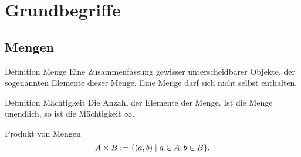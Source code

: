 \documentclass[main.tex]{subfiles}
\begin{document}
\section*{Grundbegriffe}
\subsection*{Mengen}
\begin{karte}{Definition Menge}
    Eine Zusammenfassung gewisser unterscheidbarer Objekte, 
    der sogenannten Elemente dieser Menge. Eine Menge darf sich nicht selbst enthalten.
\end{karte}
\begin{karte}{Definition Mächtigkeit}
    Die Anzahl der Elemente der Menge. Ist die Menge unendlich, 
    so ist die Mächtigkeit \( \infty \).
\end{karte}
\begin{karte}{Produkt von Mengen}
    \[ A \times B := \{ (a,b) \;\vert \; 
    a \in A, b \in B \}. \]
\end{karte}
\end{document}
